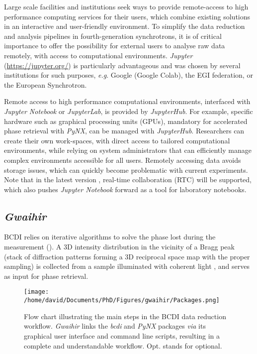 Large scale facilities and institutions seek ways to provide remote-access to high performance computing services for their users, which combine existing solutions in an interactive and user-friendly environment.
To simplify the data reduction and analysis pipelines in fourth-generation synchrotrons, it is of critical importance to offer the possibility for external users to analyse raw data remotely, with access to computational environments.
\textit{Jupyter} (\url{https://jupyter.org/}) is particularly advantageous and was chosen by several institutions for such purposes, \textit{e.g}. Google (Google Colab), the EGI federation, or the European Synchrotron.

Remote access to high performance computational environments, interfaced with \textit{Jupyter Notebook} or \textit{JupyterLab}, is provided by \textit{JupyterHub}.
For example, specific hardware such as graphical processing units (GPUs), mandatory for accelerated phase retrieval with \textit{PyNX}, can be managed with \textit{JupyterHub}.
Researchers can create their own work-spaces, with direct access to tailored computational environments, while relying on system administrators that can efficiently manage complex environments accessible for all users.
Remotely accessing data avoids storage issues, which can quickly become problematic with current experiments.
Note that in the latest version \parencite{JupyterNotebook7}, real-time collaboration (RTC) will be supported, which also pushes \textit{Jupyter Notebook} forward as a tool for laboratory notebooks.

\subsection{\textit{Gwaihir}} \label{sec:Gwaihir}

BCDI relies on iterative algorithms to solve the phase lost during the measurement (\cite{Robinson2009}).
A 3D intensity distribution in the vicinity of a Bragg peak (stack of diffraction patterns forming a 3D reciprocal space map with the proper sampling) is collected from a sample illuminated with coherent light \parencite{Robinson2005}, and serves as input for phase retrieval.

\begin{figure}[!htb]
    \centering
    \texttt{[image: /home/david/Documents/PhD/Figures/gwaihir/Packages.png]}
    \caption{
    Flow chart illustrating the main steps in the BCDI data reduction workflow.
    \textit{Gwaihir} links the \textit{bcdi} and \textit{PyNX} packages \textit{via} its graphical user interface and command line scripts, resulting in a complete and understandable workflow.
    Opt. stands for optional.
    }
    \label{fig:Packages}
\end{figure}

